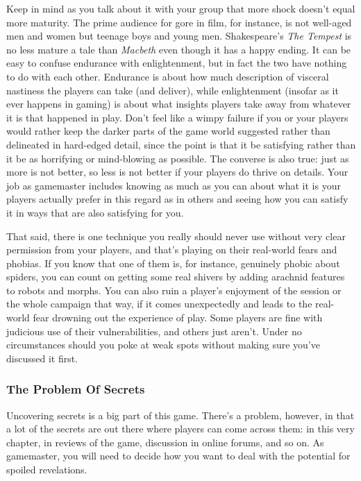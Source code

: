 Keep in mind as you talk about it with your group 
that more shock doesn't equal more maturity. The 
prime audience for gore in film, for instance, is not 
well-aged men and women but teenage boys and 
young men. Shakespeare's \textit{The Tempest }is no less 
mature a tale than \textit{Macbeth  }even though it has a 
happy ending. It can be easy to confuse endurance 
with enlightenment, but in fact the two have nothing 
to do with each other. Endurance is about how much 
description of visceral nastiness the players can take 
(and deliver), while enlightenment (insofar as it ever 
happens in gaming) is about what insights players 
take away from whatever it is that happened in play. 
Don't feel like a wimpy failure if you or your players 
would rather keep the darker parts of the game world 
suggested rather than delineated in hard-edged detail, 
since the point is that it be satisfying rather than it 
be as horrifying or mind-blowing as possible. The 
converse is also true: just as more is not better, so less 
is not better if your players do thrive on details. Your 
job as gamemaster includes knowing as much as you 
can about what it is your players actually prefer in 
this regard as in others and seeing how you can satisfy 
it in ways that are also satisfying for you. 

That said, there is one technique you really should 
never use without very clear permission from your 
players, and that's playing on their real-world fears 
and phobias. If you know that one of them is, for 
instance, genuinely phobic about spiders, you can 
count on getting some real shivers by adding arachnid 
features to robots and morphs. You can also ruin a 
player's enjoyment of the session or the whole campaign
that way, if it comes unexpectedly and leads
to the real-world fear drowning out the experience 
of play. Some players are fine with judicious use of 
their vulnerabilities, and others just aren't. Under no 
circumstances should you poke at weak spots without 
making sure you've discussed it first. 

\subsubsection{The Problem Of Secrets }

Uncovering secrets is a big part of this game. There's 
a problem, however, in that a lot of the secrets are out 
there where players can come across them: in this very 
chapter, in reviews of the game, discussion in online 
forums, and so on. As gamemaster, you will need to 
decide how you want to deal with the potential for 
spoiled revelations. 

